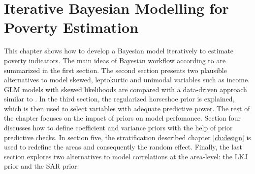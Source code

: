 \chapter{Iterative Bayesian Modelling for Poverty Estimation}

\label{ch:workflow}

This chapter shows how to develop a Bayesian model iteratively to estimate poverty indicators.
The main ideas of Bayesian workflow according to \cite{gelman_bayesian_2020} are summarized in the first section.
The second section presents two plausible alternatives to model skewed, leptokurtic and unimodal variables such as income. GLM models with skewed likelihoods are compared with a data-driven approach similar to \cite{morelli_hierarchical_2021}.
In the third section, the regularized horseshoe prior is explained, which is then used to select variables with adequate predictive power.
The rest of the chapter focuses on the impact of priors on model perfomance.
Section four discusses how to define coefficient and variance priors with the help of prior predictive checks.
In section five, the stratification described chapter \ref{ch:design} is used to redefine the areas and consequently the random effect.
Finally, the last section explores two alternatives to model correlations at the area-level: the LKJ prior and the SAR prior.









